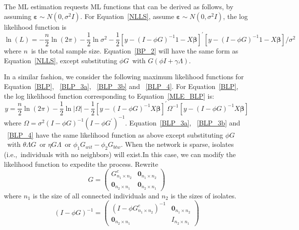 \documentclass[nojss]{jss}
\begin{document}
The ML estimation requests ML functions that can be derived as follows, by
assuming $\mathbf{\varepsilon}\sim N(0,\sigma ^{2}I).$ For
Equation~\ref{NLLS}, assume $\mathbf{\varepsilon }\sim N(0,\sigma ^{2}I)$,
the log likelihood function is
%
\begin{equation*}
\ln \left( L\right) =-\frac{n}{2}\ln \left( 2\pi \right) -\frac{1}{2}\ln
\sigma ^{2}-\frac{1}{2}\left[y-(I-\phi G)^{-1}1-X\mathbf{\beta }%
\right] ^{\prime }\left[ y-(I-\phi G)^{-1}1-X\mathbf{\beta }\right]
/\sigma ^{2}
\end{equation*}
%
where $n$\ is the total sample size.  Equation~\ref{BP_2} will have the same
form as Equation~\ref{NLLS}, except substituting $\phi G$\ with $G(\phi
I+\gamma \Lambda)$.

In a similar fashion, we consider the following maximum likelihood functions
for Equation~\ref{BLP}, ~\ref{BLP_3a}, ~\ref{BLP_3b} and ~\ref{BLP_4}.  For
Equation~\ref{BLP}, the log likelihood function corresponding
to Equation~\ref{MLE_BLP} is:
%
\begin{equation}
y=\frac{n}{2}\ln \left( 2\pi \right) -\frac{1}{2}\ln \lvert\Omega \rvert-\frac{1}{2}%
\left[ y-(I-\phi G)^{-1}X\mathbf{\beta }\right] ^{\prime }\Omega ^{-1}\left[
y-(I-\phi G)^{-1}X\mathbf{\beta }\right]  
\label{MLE_BLP}
\end{equation}
%
where $\Omega =\sigma ^{2}(I-\phi G)^{-1}(I-\phi G^{\prime })^{-1}$. 
Equation~\ref{BLP_3a}, ~\ref{BLP_3b} and ~\ref{BLP_4} have the same
likelihood function as above except substituting $\phi G$\ with $\theta
\Lambda G$\ or $\eta G\Lambda $\ or $\phi _{1}G_{wit}-\phi _{2}G_{btw}$. 
When the network is sparse, isolates (i.e.,~individuals with no neighbors)
will exist.In this case, we can modify the likelihood function to expedite
the process.  Rewrite
%
\begin{equation*}
G=\left( 
\begin{array}{cc}
G_{n_{1}\times n_{2}}^{c} & \mathbf{0}_{n_{1}\times n_{2}} \\ 
\mathbf{0}_{n_{2}\times n_{1}} & \mathbf{0}_{n_{2}\times n_{1}}%
\end{array}\right)
\end{equation*}
%
where $n_{1}$ is the size of all connected individuals and $n_{2}$ is the
sizes of isolates.
%
\begin{equation*}
\left( I-\phi G\right) ^{-1}=\left( 
\begin{array}{cc}
\left(I-\phi G_{n_{1}\times n_{2}}^{c}\right) ^{-1} & \mathbf{0}_{n_{1}\times n_{2}}
\\
\mathbf{0}_{n_{2}\times n_{1}} & I_{n_{2}\times n_{1}}
\end{array}\right)
\end{equation*}
\end{document}
